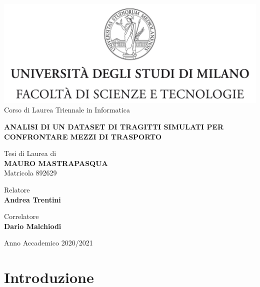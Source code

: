 \documentclass[a4paper,12pt]{report}
\begin{document}
\begin{titlepage}
	\begin{center}
		\includegraphics[width=\textwidth]{Logo.jpg}
		\large{Corso di Laurea Triennale in Informatica}
		
		\vspace{1.4cm}
		
		\Large{\textbf{ANALISI DI UN DATASET DI TRAGITTI SIMULATI PER CONFRONTARE MEZZI DI TRASPORTO}}
		
		\vspace{1.4cm}
		
		\large{Tesi di Laurea di} \\
		\large{\textbf{MAURO MASTRAPASQUA}} \\
		\large{Matricola 892629}
	\end{center}

	\begin{flushleft}
		\vspace{1.4cm}
		
		\normalsize{Relatore} \\
		\normalsize{\textbf{Andrea Trentini}}

		\vspace{0.4cm}

		\normalsize{Correlatore} \\
		\normalsize{\textbf{Dario Malchiodi}}
	\end{flushleft}

	\begin{center}
		\vspace{1.4cm}
		
		\large{Anno Accademico 2020/2021}
	\end{center}
\end{titlepage}

\tableofcontents
\listoftodos

\chapter{Introduzione}

\end{document}
